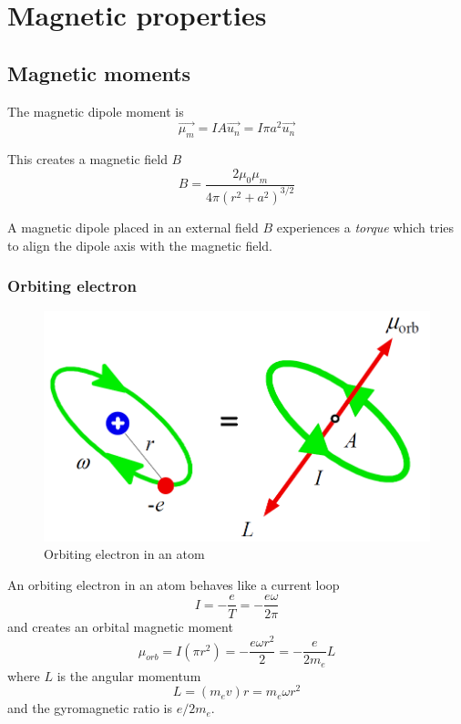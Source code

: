 \section{Magnetic properties}

\subsection{Magnetic moments}
The magnetic dipole moment is
\begin{equation}
    \vec{\mu_m} = I A \vec{u_n} = I \pi a^2 \vec{u_n}
\end{equation}

This creates a magnetic field $B$
\begin{equation}
    B = \frac{2 \mu_0 \mu_m}{4 \pi (r^2 + a^2)^{3/2}}
\end{equation}

A magnetic dipole placed in an external field $B$ experiences a \emph{torque}
which tries to align the dipole axis with the magnetic field.

\subsubsection{Orbiting electron}
\begin{figure}[ht!]
    \centering
    \includegraphics[width=0.4\linewidth]{images/orbiting_e.png}
    \caption{Orbiting electron in an atom}
\end{figure}

An orbiting electron in an atom behaves like a current loop
\begin{equation}
    I = -\frac{e}{T} = - \frac{e \omega}{2 \pi}
\end{equation}
and creates an orbital magnetic moment
\begin{equation}
    \mu_{orb} = I(\pi r^2) = -\frac{e \omega r^2}{2} = -\frac{e}{2 m_e} L
\end{equation}
where $L$ is the angular momentum
\begin{equation}
    L = (m_e v)r = m_e \omega r^2
\end{equation}
and the gyromagnetic ratio is $e / 2m_e$.

